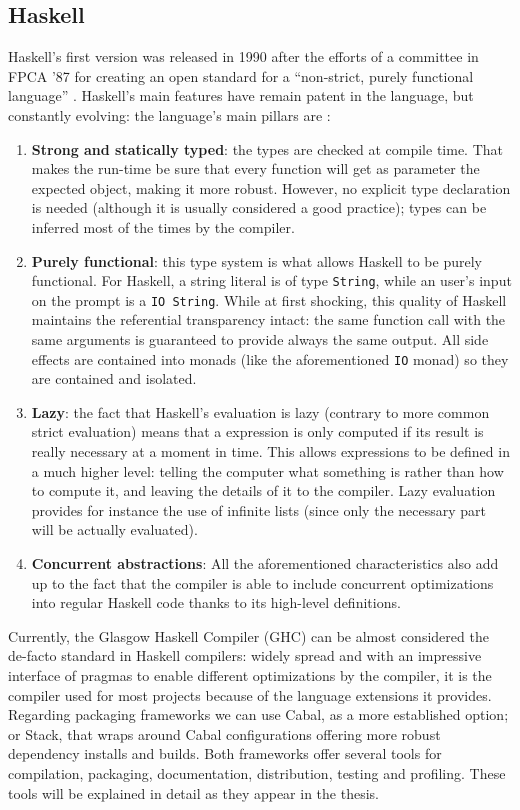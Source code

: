\subsection{Haskell}

Haskell's first version was released in 1990 after the efforts of a committee
in FPCA '87 for creating an open standard for a ``non-strict, purely functional
language'' \cite{haskell-history}. Haskell's main features have remain patent
in the language, but constantly evolving: the language's main pillars are
\cite{haskell-98, haskell-2010}:

\begin{enumerate}
\item \textbf{Strong and statically typed}: the types are checked at compile
  time. That makes the run-time be sure that every function will get as
  parameter the expected object, making it more robust. However, no explicit
  type declaration is needed (although it is usually considered a good
  practice); types can be inferred most of the times by the compiler.
\item \textbf{Purely functional}: this type system is what allows Haskell to be
  purely functional. For Haskell, a string literal is of type \texttt{String},
  while an user's input on the prompt is a \texttt{IO String}. While at first
  shocking, this quality of Haskell maintains the referential transparency
  intact: the same function call with the same arguments is guaranteed to
  provide always the same output. All side effects are contained into monads
  (like the aforementioned \texttt{IO} monad) so they are contained and
  isolated.
\item \textbf{Lazy}: the fact that Haskell's evaluation is lazy (contrary to
  more common strict evaluation) means that a expression is only computed if
  its result is really necessary at a moment in time. This allows expressions
  to be defined in a much higher level: telling the computer what something is
  rather than how to compute it, and leaving the details of it to the compiler.
  Lazy evaluation provides for instance the use of infinite lists (since only
  the necessary part will be actually evaluated).
\item \textbf{Concurrent abstractions}: All the aforementioned characteristics
  also add up to the fact that the compiler is able to include concurrent
  optimizations into regular Haskell code thanks to its high-level definitions.
\end{enumerate}

Currently, the Glasgow Haskell Compiler (GHC) can be almost considered the
de-facto standard in Haskell compilers: widely spread and with an impressive
interface of pragmas to enable different optimizations by the compiler, it is
the compiler used for most projects because of the language extensions it
provides. Regarding packaging frameworks we can use Cabal, as a more
established option; or Stack, that wraps around Cabal configurations offering
more robust dependency installs and builds. Both frameworks offer several tools
for compilation, packaging, documentation, distribution, testing and profiling.
These tools will be explained in detail as they appear in the thesis.\\

